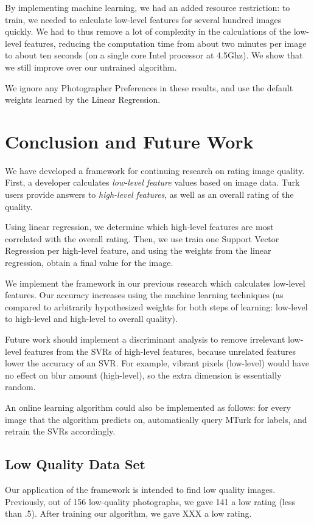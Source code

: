 \documentclass[11pt,letter]{article}
\begin{document}
By implementing machine learning, we had an added resource restriction: to train, we needed to calculate low-level features for several hundred images quickly. We had to thus remove a lot of complexity in the calculations of the low-level features, reducing the computation time from about two minutes per image to about ten seconds (on a single core Intel processor at 4.5Ghz). We show that we still improve over our untrained algorithm.

We ignore any Photographer Preferences in these results, and use the default weights learned by the Linear Regression.

\section{Conclusion and Future Work}
We have developed a framework for continuing research on rating image quality. First, a developer calculates \textit{low-level feature} values based on image data. Turk users provide answers to \textit{high-level features}, as well as an overall rating of the quality.

Using linear regression, we determine which high-level features are most correlated with the overall rating. Then, we use train one Support Vector Regression per high-level feature, and using the weights from the linear regression, obtain a final value for the image.

We implement the framework in our previous research which calculates low-level features. Our accuracy increases using the machine learning techniques (as compared to arbitrarily hypothesized weights for both steps of learning: low-level to high-level and high-level to overall quality).

Future work should implement a discriminant analysis to remove irrelevant low-level features from the SVRs of high-level features, because unrelated features lower the accuracy of an SVR. For example, vibrant pixels (low-level) would have no effect on blur amount (high-level), so the extra dimension is essentially random.

An online learning algorithm could also be implemented as follows: for every image that the algorithm predicts on, automatically query MTurk for labels, and retrain the SVRs accordingly.

\subsection{Low Quality Data Set}
Our application of the framework is intended to find low quality images. Previously, out of 156 low-quality photographs, we gave 141 a low rating (less than .5). After training our algorithm, we gave XXX a low rating.
\end{document}
